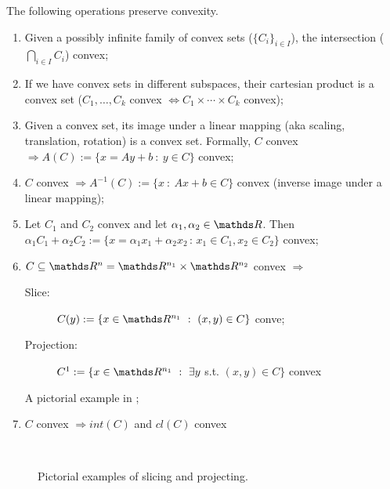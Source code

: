 \documentclass[computational_mathematics.tex]{subfiles}
\begin{document}
\begin{proposition}
The following operations preserve convexity.
\begin{enumerate}
  \item Given a possibly infinite family of convex sets (${\{C_i\}}_{i \in I}$), the intersection ($\bigcap_{i \in I} C_i$) convex;
  
  \item If we have convex sets in different subspaces, their cartesian product is a convex set ($C_1, \ldots, C_k$ convex $\iff C_1 \times \cdots \times C_k$ convex);
  
  \item Given a convex set, its image under a linear mapping (aka scaling, translation, rotation) is a convex set. Formally, $C$ convex $\Longrightarrow A(C) := \{x = Ay + b~:~y \in C\}$ convex; 
  
  \item $C$ convex $\Longrightarrow A^{-1}(C) := \{x~:~Ax + b \in C\}$ convex (inverse image under a linear mapping);
  
  \item Let $C_1$ and $C_2$ convex and let $\alpha_1, \alpha_2 \in \R$. Then $\alpha_1 C_1 + \alpha_2 C_2 := \{ x = \alpha_1 x_1 + \alpha_2 x_2 \,:\, x_1 \in C_1, x_2 \in C_2\}$ convex;
  \item $C \subseteq \R^n = \R^{n_1} \times \R^{n_2}$ convex $\Longrightarrow$
  \begin{description}
    \item[{\small \sc Slice:}] $C(y) := \{x \in \R^{n_1}~:~(x, y) \in C\}$ conve;
    \item[{\small \sc Projection:}] $C^1 := \{x \in \R^{n_1}~:~\exists y$ s.t. $(x, y) \in C\}$ convex
  \end{description}
    A pictorial example in ;
  \item $C$ convex $\Longrightarrow int(C)$ and $cl(C)$ convex
\end{enumerate}
\end{proposition}

\begin{figure}[h]
  \centering
  \hspace{0.5cm}
  \\
  \caption{Pictorial examples of slicing and projecting.}\label{fig:5ott_3}
\end{figure}
\end{document}
